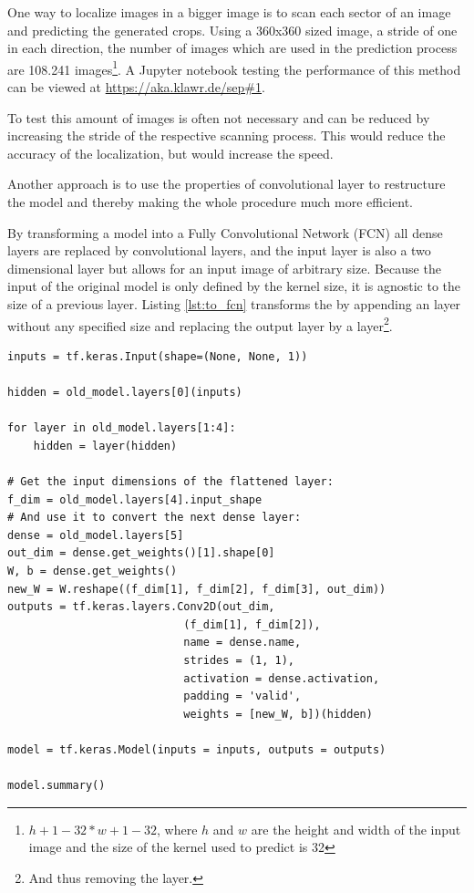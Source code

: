 One way to localize images in a bigger image is to scan each sector of an image and predicting the generated crops.
Using a 360x360 sized image, a stride of one in each direction, the number of images which are used in the prediction process are 108.241 images\footnote{$h + 1 - 32 * w + 1 - 32$, where $h$ and $w$ are the height and width of the input image and the size of the kernel used to predict is 32}.
A Jupyter notebook testing the performance of this method can be viewed at \url{https://aka.klawr.de/sep#1}. %

To test this amount of images is often not necessary and can be reduced by increasing the stride of the respective scanning process.
This would reduce the accuracy of the localization, but would increase the speed.

Another approach is to use the properties of convolutional layer to restructure the model and thereby making the whole procedure much more efficient.

By transforming a model into a Fully Convolutional Network (FCN) all dense layers are replaced by convolutional layers, and the input layer is also a two dimensional layer but allows for an input image of arbitrary size.
Because the input of the original model is only defined by the kernel size, it is agnostic to the size of a previous layer.
Listing \ref{lst:to_fcn} transforms the  by appending an  layer without any specified size and replacing the output layer by a  layer\footnote{And thus removing the  layer.}.

\begin{lstlisting}[caption={Transformation of the Symbol Classifier into a FCN.}, label=lst:to_fcn]
inputs = tf.keras.Input(shape=(None, None, 1))

hidden = old_model.layers[0](inputs)

for layer in old_model.layers[1:4]:
    hidden = layer(hidden)

# Get the input dimensions of the flattened layer:
f_dim = old_model.layers[4].input_shape
# And use it to convert the next dense layer:
dense = old_model.layers[5]
out_dim = dense.get_weights()[1].shape[0]
W, b = dense.get_weights()
new_W = W.reshape((f_dim[1], f_dim[2], f_dim[3], out_dim))
outputs = tf.keras.layers.Conv2D(out_dim,
                           (f_dim[1], f_dim[2]),
                           name = dense.name,
                           strides = (1, 1),
                           activation = dense.activation,
                           padding = 'valid',
                           weights = [new_W, b])(hidden)

model = tf.keras.Model(inputs = inputs, outputs = outputs)

model.summary()
\end{lstlisting}

